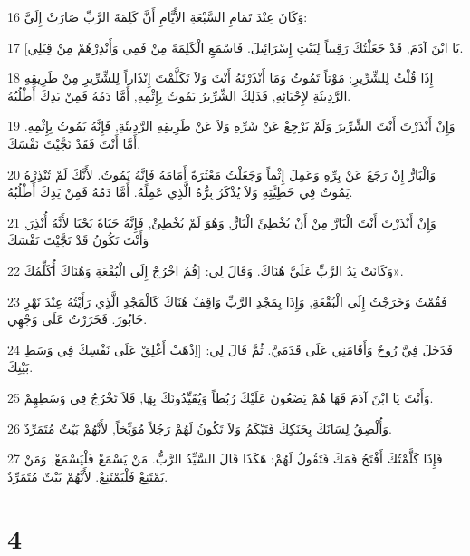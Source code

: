 \par 16 وَكَانَ عِنْدَ تَمَامِ السَّبْعَةِ الأَيَّامِ أَنَّ كَلِمَةَ الرَّبِّ صَارَتْ إِلَيَّ:
\par 17 [يَا ابْنَ آدَمَ, قَدْ جَعَلْتُكَ رَقِيباً لِبَيْتِ إِسْرَائِيلَ. فَاسْمَعِ الْكَلِمَةَ مِنْ فَمِي وَأَنْذِرْهُمْ مِنْ قِبَلِي.
\par 18 إِذَا قُلْتُ لِلشِّرِّيرِ: مَوْتاً تَمُوتُ وَمَا أَنْذَرْتَهُ أَنْتَ وَلاَ تَكَلَّمْتَ إِنْذَاراً لِلشِّرِّيرِ مِنْ طَرِيقِهِ الرَّدِيئَةِ لإِحْيَائِهِ, فَذَلِكَ الشِّرِّيرُ يَمُوتُ بِإِثْمِهِ, أَمَّا دَمُهُ فَمِنْ يَدِكَ أَطْلُبُهُ.
\par 19 وَإِنْ أَنْذَرْتَ أَنْتَ الشِّرِّيرَ وَلَمْ يَرْجِعْ عَنْ شَرِّهِ وَلاَ عَنْ طَرِيقِهِ الرَّدِيئَةِ, فَإِنَّهُ يَمُوتُ بِإِثْمِهِ. أَمَّا أَنْتَ فَقَدْ نَجَّيْتَ نَفْسَكَ.
\par 20 وَالْبَارُّ إِنْ رَجَعَ عَنْ بِرِّهِ وَعَمِلَ إِثْماً وَجَعَلْتُ مَعْثَرَةً أَمَامَهُ فَإِنَّهُ يَمُوتُ. لأَنَّكَ لَمْ تُنْذِرْهُ يَمُوتُ فِي خَطِيَّتِهِ وَلاَ يُذْكَرُ بِرُّهُ الَّذِي عَمِلَهُ. أَمَّا دَمُهُ فَمِنْ يَدِكَ أَطْلُبُهُ.
\par 21 وَإِنْ أَنْذَرْتَ أَنْتَ الْبَارَّ مِنْ أَنْ يُخْطِئَ الْبَارُّ, وَهُوَ لَمْ يُخْطِئْ, فَإِنَّهُ حَيَاةً يَحْيَا لأَنَّهُ أُنْذِرَ, وَأَنْتَ تَكُونُ قَدْ نَجَّيْتَ نَفْسَكَ
\par 22 وَكَانَتْ يَدُ الرَّبِّ عَلَيَّ هُنَاكَ. وَقَالَ لِي: [قُمُ اخْرُجْ إِلَى الْبُقْعَةِ وَهُنَاكَ أُكَلِّمُكَ».
\par 23 فَقُمْتُ وَخَرَجْتُ إِلَى الْبُقْعَةِ, وَإِذَا بِمَجْدِ الرَّبِّ وَاقِفٌ هُنَاكَ كَالْمَجْدِ الَّذِي رَأَيْتُهُ عِنْدَ نَهْرِ خَابُورَ. فَخَرَرْتُ عَلَى وَجْهِي.
\par 24 فَدَخَلَ فِيَّ رُوحٌ وَأَقَامَنِي عَلَى قَدَمَيَّ. ثُمَّ قَالَ لِي: [اِذْهَبْ أَغْلِقْ عَلَى نَفْسِكَ فِي وَسَطِ بَيْتِكَ.
\par 25 وَأَنْتَ يَا ابْنَ آدَمَ فَهَا هُمْ يَضَعُونَ عَلَيْكَ رُبُطاً وَيُقَيِّدُونَكَ بِهَا, فَلاَ تَخْرُجُ فِي وَسَطِهِمْ.
\par 26 وَأُلْصِقُ لِسَانَكَ بِحَنَكِكَ فَتَبْكَمُ وَلاَ تَكُونُ لَهُمْ رَجُلاً مُوَبِّخاً, لأَنَّهُمْ بَيْتٌ مُتَمَرِّدٌ.
\par 27 فَإِذَا كَلَّمْتُكَ أَفْتَحُ فَمَكَ فَتَقُولُ لَهُمْ: هَكَذَا قَالَ السَّيِّدُ الرَّبُّ. مَنْ يَسْمَعْ فَلْيَسْمَعْ, وَمَنْ يَمْتَنِعْ فَلْيَمْتَنِعْ. لأَنَّهُمْ بَيْتٌ مُتَمَرِّدٌ.

\chapter{4}

